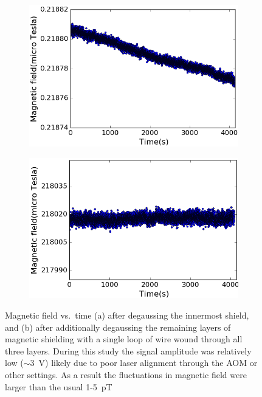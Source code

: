 \begin{figure}
  \centering
  \begin{subfigure}[b]{0.48\textwidth}
    \centering
    \includegraphics[width=\textwidth]{figures/before_degaussing}
    \caption{}
    \label{fig:with DG_innermost}
  \end{subfigure}
  \hfill
  \begin{subfigure}[b]{0.48\textwidth}
    \centering
    \includegraphics[width=\textwidth]{figures/after-degaussing.png}
    \caption{}
    \label{fig:with DG}
  \end{subfigure}
  \caption{Magnetic field vs.~time (a) after degaussing the innermost
    shield, and (b) after additionally degaussing the remaining layers
    of magnetic shielding with a single loop of wire wound through all
    three layers. During this study the signal amplitude was
    relatively low ($\sim 3$~V) likely due to poor laser alignment
    through the AOM or other settings. As a result the fluctuations in
    magnetic field were larger than the usual 1-5~pT~\label{fig:effect
      of DG}}
\end{figure}

